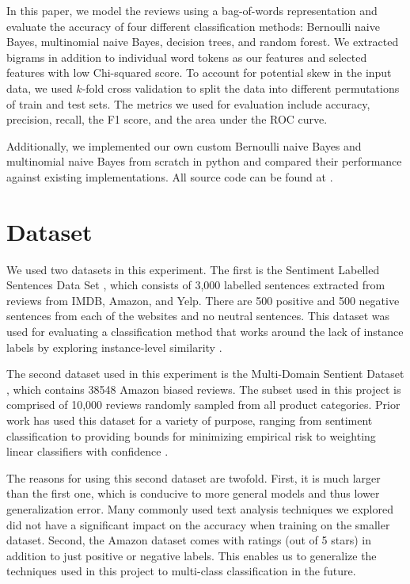 \documentclass{article} %
\begin{document}
In this paper, we model the reviews using a bag-of-words representation and evaluate the accuracy of four different classification methods: Bernoulli naive Bayes, multinomial naive Bayes, decision trees, and random forest. We extracted bigrams in addition to individual word tokens as our features and selected features with low Chi-squared score. To account for potential skew in the input data, we used $k$-fold cross validation to split the data into different permutations of train and test sets. The metrics we used for evaluation include accuracy, precision, recall, the F1 score, and the area under the ROC curve.

Additionally, we implemented our own custom Bernoulli naive Bayes and multinomial naive Bayes from scratch in python and compared their performance against existing implementations. All source code can be found at \cite{myrepo}.

\section{Dataset}

We used two datasets in this experiment. The first is the Sentiment Labelled Sentences Data Set \cite{smalldataset}, which consists of 3,000 labelled sentences extracted from reviews from IMDB, Amazon, and Yelp. There are 500 positive and 500 negative sentences from each of the websites and no neutral sentences. This dataset was used for evaluating a classification method that works around the lack of instance labels by exploring instance-level similarity \cite{individuallabel}.

The second dataset used in this experiment is the Multi-Domain Sentient Dataset \cite{largedataset}, which contains 38548 Amazon biased reviews. The subset used in this project is comprised of 10,000 reviews randomly sampled from all product categories. Prior work has used this dataset for a variety of purpose, ranging from sentiment classification \cite{domainadaptation} to providing bounds for minimizing empirical risk \cite{learningbounds} to weighting linear classifiers with confidence \cite{confidenceweight}.

The reasons for using this second dataset are twofold. First, it is much larger than the first one, which is conducive to more general models and thus lower generalization error. Many commonly used text analysis techniques we explored did not have a significant impact on the accuracy when training on the smaller dataset. Second, the Amazon dataset comes with ratings (out of 5 stars) in addition to just positive or negative labels. This enables us to generalize the techniques used in this project to multi-class classification in the future.
\end{document}
